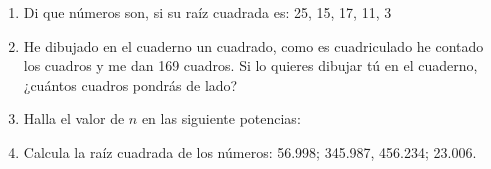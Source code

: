 \documentclass[letterpaper,11pt,twoside]{article}
\begin{document}
\begin{enumerate}
\item Di que números son, si su raíz cuadrada es: 25, 15, 17, 11, 3
\item He dibujado en el cuaderno un cuadrado, como es cuadriculado he contado los cuadros y me dan 169 cuadros. Si lo quieres dibujar tú en el cuaderno, ¿cuántos cuadros pondrás de lado?
\item Halla el valor de $n$ en las siguiente potencias:
\begin{enumerate}
\end{enumerate}
\item Calcula la raíz cuadrada de los números: 56.998; 345.987, 456.234; 23.006.

\end{enumerate}
\end{document}
